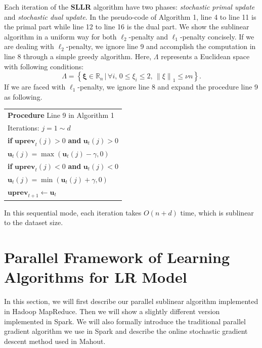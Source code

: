 \documentclass[10pt, conference, compsocconf]{IEEEtran}
\newcommand{\bu}{\mathbf{u}}
\newcommand{\buprev}{\mathbf{uprev}}
\newcommand{\bxi}{\mathbf{\xi}}
\newcommand{\lc}{\left(}
\newcommand{\rc}{\right)}
\newcommand{\lj}{\lc j\rc}
\newcommand{\tspace}{\hspace*{2em}}
\begin{document}
Each iteration of the \textbf{SLLR} algorithm have two phases: \textit{stochastic primal update} and \textit{stochastic dual update}.
In the pseudo-code of Algorithm 1, line 4 to line 11 is the primal part while line 12 to line 16 is the dual part.
We show the sublinear algorithm in a uniform way for both $\ell_2$-penalty and $\ell_1$-penalty concisely.
If we are dealing with $\ell_2$-penalty, we ignore line 9 and accomplish the computation in line 8 through a simple greedy algorithm.
Here, $\Lambda$ represents a Euclidean space with following conditions:
\[
\Lambda=\left\{ \bxi\in\mathbb{R}_{n} \, | \, \forall i, \, 0\leq{\xi}_{i}\leq 2, \, {\|\xi \|}_{1}\leq \nu n  \right
\}.
\]
If we are faced with $\ell_1$-penalty, we ignore line 8 and expand the procedure line 9 as following.
\begin{table} [ht]
\begin{tabular}{l}
\hline\noalign{\smallskip}
\textbf{Procedure} Line 9 in Algorithm 1\\
\noalign{\smallskip}
\hline
\noalign{\smallskip}
Iterations: $j=1 \sim d$ \\
\tspace \textbf{if} $\buprev_t\lj>0$ \textbf{and} $\bu_t\lj>0$ \\
\tspace\tspace $\bu_t\lj=\max \lc \bu_t\lj-\gamma ,0 \rc$ \\
\tspace \textbf{if} $\buprev_t\lj<0$ \textbf{and} $\bu_t\lj<0$ \\
\tspace\tspace $\bu_t\lj=\min \lc \bu_t\lj+\gamma ,0 \rc$ \\
$\buprev_{t+1}\leftarrow\bu_t$ \\
\hline
\end{tabular}
\end{table}

In this sequential mode, each iteration takes $O(n+d)$ time, which is sublinear to the dataset size.

\section{Parallel Framework of Learning Algorithms for LR Model} \label{sec:framework}
In this section, we will first describe our parallel sublinear algorithm implemented in Hadoop MapReduce.
Then we will show a slightly different version implemented in Spark.
We will also formally introduce the traditional parallel gradient algorithm we use in Spark and describe the online stochastic gradient descent method used in Mahout.
\end{document}
